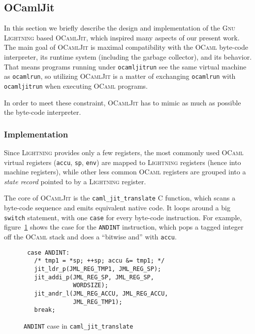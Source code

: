 \documentclass[a4paper]{acm_proc_article-sp}
\begin{document}
\subsection{OCamlJit} \label{subsection:OCamlJit}

In this section we briefly describe the design and implementation of the \textsc{Gnu Lightning}\cite{Bonzini10}
based \textsc{OCamlJit}\cite{Starynkevitch04},
which inspired many aspects of our present work. The main goal of \textsc{OCamlJit} is maximal compatibility
with the \textsc{OCaml} byte-code interpreter, its runtime system (including the garbage collector), and its
behavior. That means programs running under \texttt{ocamljitrun} see the same virtual machine as
\texttt{ocamlrun}, so utilizing \textsc{OCamlJit} is a matter of exchanging \texttt{ocamlrun} with
\texttt{ocamljitrun} when executing \textsc{OCaml} programs.

In order to meet these constraint, \textsc{OCamlJit} has to mimic as much as possible the byte-code
interpreter.

\subsubsection{Implementation}

Since \textsc{Lightning} provides only a few registers, the most commonly used \textsc{OCaml} virtual
registers (\texttt{accu}, \texttt{sp}, \texttt{env}) are mapped to \textsc{Lightning} registers (hence
into machine registers), while other less common \textsc{OCaml} registers are grouped into a \emph{state
record} pointed to by a \textsc{Lightning} register.

The core of \textsc{OCamlJit} is the \texttt{caml\_jit\_translate} C function, which scans a byte-code
sequence and emits equivalent native code. It loops around a big \texttt{switch} statement, with one
\texttt{case} for every byte-code instruction. For example, figure~\ref{figure:caml_jit_translate_andint} shows
the case for the \texttt{ANDINT} instruction, which pops a tagged integer off the \textsc{OCaml} stack
and does a ``bitwise and'' with \texttt{accu}.

\begin{figure}[ht]
  \centering
  \begin{verbatim}
 case ANDINT:
   /* tmp1 = *sp; ++sp; accu &= tmp1; */
   jit_ldr_p(JML_REG_TMP1, JML_REG_SP);
   jit_addi_p(JML_REG_SP, JML_REG_SP,
              WORDSIZE);
   jit_andr_l(JML_REG_ACCU, JML_REG_ACCU,
              JML_REG_TMP1);
   break;
\end{verbatim}
  \caption{\texttt{ANDINT} case in \texttt{caml\_jit\_translate}}
  \label{figure:caml_jit_translate_andint}
\end{figure}
\end{document}
